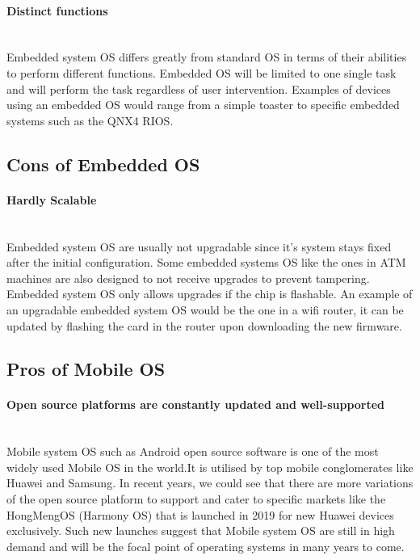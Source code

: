 \documentclass[conference]{IEEEtran}
\newcommand{\forceindent}{\leavevmode{\parindent=1em\indent}}
\begin{document}
\bigskip
\paragraph{Distinct functions} \mbox{} \\
\forceindent Embedded system OS differs greatly from standard OS in terms of their abilities to perform different functions. Embedded OS will be limited to one single task and will perform the task regardless of user intervention. Examples of devices using an embedded OS would range from a simple toaster to specific embedded systems such as the QNX4 RIOS\cite{NOSvsEOS}.

\bigskip
\subsection{Cons of Embedded OS}
\paragraph{Hardly Scalable} \mbox{} \\
\forceindent Embedded system OS are usually not upgradable since it's system stays fixed after the initial configuration. Some embedded systems OS like the ones in  ATM machines are also designed to not receive upgrades to prevent tampering. Embedded system OS only allows upgrades if the chip is flashable. An example of an upgradable embedded system OS would be the one in a wifi router, it can be updated by flashing the card in the router upon downloading the new firmware\cite{lifewire}.

\bigskip
\subsection{Pros of Mobile OS}
\paragraph{Open source platforms are constantly updated and well-supported} \mbox{} \\
\forceindent Mobile  system OS such as Android open source software is one of the most widely used Mobile OS in the world.It is utilised by top mobile conglomerates like Huawei and Samsung. In recent years, we could see that there are more variations of the open source platform to support and cater to specific markets like the HongMengOS (Harmony OS) that is launched in 2019 for new Huawei devices exclusively\cite{HuaweiHongmeng}. Such new launches suggest that Mobile system OS are still in high demand and will be the focal point of operating systems in many years to come.
\end{document}
